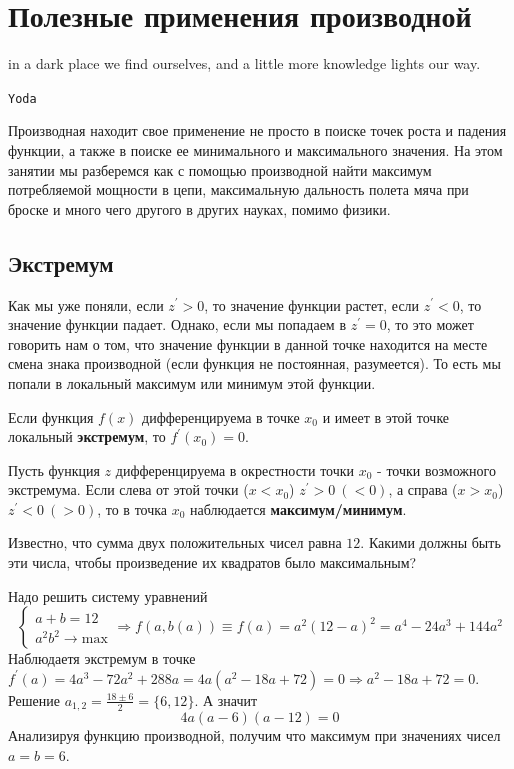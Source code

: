 \section{Полезные применения производной}
\epigraph{\textsf{in a dark place we find ourselves, and a little more knowledge lights our way.}}{\texttt{Yoda}}
Производная находит свое применение не просто в поиске точек роста и падения функции, а также в поиске ее минимального и максимального значения. 
На этом занятии мы разберемся как с помощью производной найти максимум потребляемой мощности в цепи, максимальную дальность полета мяча при броске и много чего другого в других науках, помимо физики.
\subsection{Экстремум}
Как мы уже поняли, если $z^{'} > 0$, то значение функции растет, если $z^{'} < 0$, то значение функции падает. Однако, если мы попадаем в $z^{'} = 0$, то это может говорить нам о том, что значение функции в данной точке находится на месте смена знака производной (если функция не постоянная, разумеется). То есть мы попали в локальный максимум или минимум этой функции.
\begin{theorem}[Ферма]
    Если функция $f(x)$ дифференцируема в точке $x_0$ и имеет в этой точке локальный \textbf{экстремум}, то $f^{'}(x_0) = 0$.
\end{theorem}
\begin{theorem}
    Пусть функция $z$ дифференцируема в окрестности точки $x_0$ - точки возможного экстремума. Если слева от этой точки ($x < x_0$) $z^{'} > 0\ (<0)$, а справа ($x > x_0$) $z^{'} < 0\ (>0)$, то в точка $x_0$ наблюдается \textbf{максимум/минимум}.
\end{theorem}
\begin{example}
    Известно, что сумма двух положительных чисел равна $12$. Какими должны быть эти числа, чтобы произведение их квадратов было максимальным?

    Надо решить систему уравнений
    \begin{equation*}
        \begin{cases}
            a + b = 12\\
            a^2b^2 \rightarrow \text{max}
        \end{cases} \Rightarrow
        f(a, b(a)) \equiv f(a) = a^2(12 - a)^2 = a^4 - 24a^3 + 144a^2
    \end{equation*}
    Наблюдаетя экстремум в точке $f^{'}(a) = 4a^3 -72a^2 + 288 a = 4a(a^2 - 18a + 72) =0 \Rightarrow a^2 - 18a + 72 = 0$. Решение $a_{1,2} = \frac{18 \pm 6}{2} = \{6, 12 \}$. А значит
    \begin{equation*}
        4a (a - 6)(a - 12) = 0 
    \end{equation*}
    Анализируя функцию производной, получим что максимум при значениях чисел $a = b = 6$.
\end{example}

